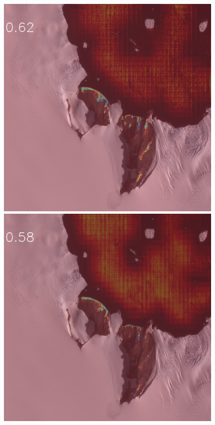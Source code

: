 \begin{figure}[h]
\includegraphics[width=\subFigx]{./fig/datagrow/MSE_single_unet_train_0_1.txt_bias-1_bs128_do0.1e25/WV03_20170217064537_10400100297FEA00_17FEB17064537-M1BS-057107305010_01_P001_u08rf3031.png}
\includegraphics[width=\subFigx]{./fig/datagrow/MSE_single_unet_train_0_2.txt_bias-1_bs128_do0.1e25/WV03_20170217064537_10400100297FEA00_17FEB17064537-M1BS-057107305010_01_P001_u08rf3031.png}

\end{figure}
